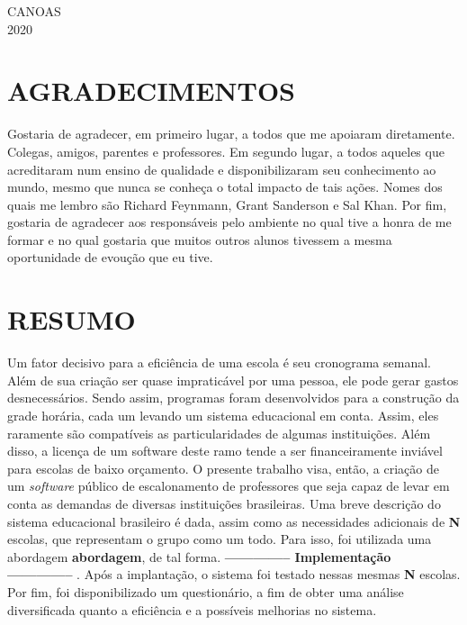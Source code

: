 \documentclass[12pt,a4paper]{article}
\newenvironment{bottompar}{\par\vspace*{\fill}}{\clearpage}
\begin{document}
	\begin{bottompar}
		\begin{center}
			CANOAS \\
			2020
		\end{center}
	\end{bottompar}


	\thispagestyle{empty}
	\section*{AGRADECIMENTOS}

	Gostaria de agradecer, em primeiro lugar, a todos que me apoiaram diretamente. Colegas, amigos, parentes e professores. Em segundo lugar, a todos aqueles que acreditaram num ensino de qualidade e disponibilizaram seu conhecimento ao mundo, mesmo que nunca se conheça o total impacto de tais ações. Nomes dos quais me lembro são Richard Feynmann, Grant Sanderson e Sal Khan. Por fim, gostaria de agradecer aos responsáveis pelo ambiente no qual tive a honra de me formar e no qual gostaria que muitos outros alunos tivessem a mesma oportunidade de evoução que eu tive.

	\newpage


	\thispagestyle{empty}
	\section*{RESUMO}

	Um fator decisivo para a eficiência de uma escola é seu cronograma semanal. Além de sua criação ser quase impraticável por uma pessoa, ele pode gerar gastos desnecessários. Sendo assim, programas foram desenvolvidos para a construção da grade horária, cada um levando um sistema educacional em conta. Assim, eles raramente são compatíveis as particularidades de algumas instituições. Além disso, a licença de um software deste ramo tende a ser financeiramente inviável para escolas de baixo orçamento.  O presente trabalho visa, então, a criação de um \textit{software} público de escalonamento de professores que seja capaz de levar em conta as demandas de diversas instituições brasileiras. Uma breve descrição do sistema educacional brasileiro é dada, assim como as necessidades adicionais de \textbf{N} escolas, que representam o grupo como um todo. Para isso, foi utilizada uma abordagem \textbf{abordagem}, de tal forma. \textbf{ -------------- Implementação -------------- }. Após a implantação, o sistema foi testado nessas mesmas \textbf{N} escolas. Por fim, foi disponibilizado um questionário, a fim de obter uma análise diversificada quanto a eficiência e a possíveis melhorias no sistema.
\end{document}
